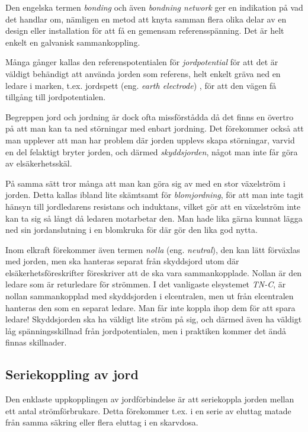 Den engelska termen \emph{bonding} och även \emph{bondning network} ger en
indikation på vad det handlar om, nämligen en metod att knyta samman flera
olika delar av en design eller installation för att få en gemensam
referensspänning.
Det är helt enkelt en galvanisk sammankoppling.

Många gånger kallas den referenspotentialen för \emph{jordpotential} för att
det är väldigt behändigt att använda jorden som referens, helt enkelt gräva ned
en ledare i marken, t.ex. jordspett (eng. \emph{earth electrode})
\cite[kap 3.1.2]{K27-1991}, för att den vägen få tillgång till jordpotentialen.

Begreppen jord och jordning är dock ofta missförstådda då det finns en övertro
på att man kan ta ned störningar med enbart jordning.
Det förekommer också att man upplever att man har problem där jorden upplevs
skapa störningar, varvid en del felaktigt bryter jorden, och därmed
\emph{skyddsjorden}, något man inte får göra av elsäkerhetsskäl.

På samma sätt tror många att man kan göra sig av med en stor växelström i
jorden.
Detta kallas ibland lite skämtsamt för \emph{blomjordning}, för att man inte
tagit hänsyn till jordledarens resistans och induktans, vilket gör att en
växelström inte kan ta sig så långt då ledaren motarbetar den.
Man hade lika gärna kunnat lägga ned sin jordanslutning i en blomkruka för där
gör den lika god nytta.

Inom elkraft förekommer även termen \emph{nolla} (eng. \emph{neutral}), den
kan lätt förväxlas med jorden, men ska hanteras separat från skyddsjord utom
där elsäkerhetsföreskrifter föreskriver att de ska vara sammankopplade.
Nollan är den ledare som är returledare för strömmen.
I det vanligaste elsystemet \emph{TN-C}, är nollan sammankopplad med skyddsjorden
i elcentralen, men ut från elcentralen hanteras den som en separat ledare.
Man får inte koppla ihop dem för att spara ledare!
Skyddsjorden ska ha väldigt lite ström på sig, och därmed även ha väldigt
låg spänningsskillnad från jordpotentialen, men i praktiken kommer det ändå
finnas skillnader.

\subsection{Seriekoppling av jord}

Den enklaste uppkopplingen av jordförbindelse är att seriekoppla jorden
\cite[kap 3]{ott1988} mellan ett antal strömförbrukare.
Detta förekommer t.ex. i en serie av eluttag matade från samma säkring
eller flera eluttag i en skarvdosa.

